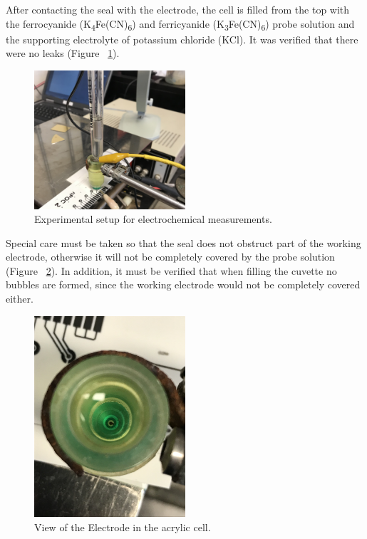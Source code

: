 After contacting the seal with the electrode, the cell is filled from the top with the ferrocyanide (K\textsubscript{4}Fe(CN)\textsubscript{6}) and ferricyanide (K\textsubscript{3}Fe(CN)\textsubscript{6}) probe solution and the supporting electrolyte of potassium chloride (KCl). It was verified that there were no leaks (Figure ~\ref{fig:Figura_prueba_electroquimica}).

\begin{figure}[H]
  \centering
    \includegraphics[width=0.5\textwidth]{Figures/Figura_prueba_electroquimica}
  \caption{Experimental setup for electrochemical measurements.}
  \label{fig:Figura_prueba_electroquimica}
\end{figure}

Special care must be taken so that the seal does not obstruct part of the working electrode, otherwise it will not be completely covered by the probe solution (Figure ~\ref{fig:Figura_electrodo_sonda}). In addition, it must be verified that when filling the cuvette no bubbles are formed, since the working electrode would not be completely covered either.

\begin{figure}[H]
  \centering
    \includegraphics[width=0.5\textwidth]{Figures/Figura_electrodo_sonda}
  \caption{View of the Electrode in the acrylic cell.}
  \label{fig:Figura_electrodo_sonda}
\end{figure}

